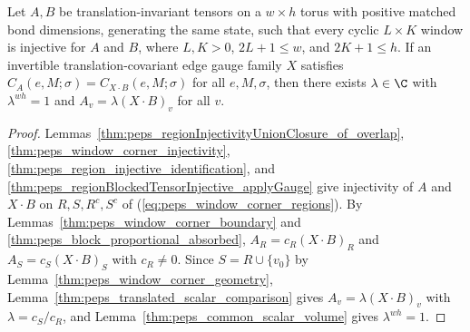 \begin{lemma}%
    \label{thm:peps_window_absorbed_scalar}
    \leanok
    Let $A,B$ be translation-invariant tensors on a $w\times h$ torus with
    positive matched bond dimensions, generating the same state, such that
    every cyclic $L\times K$ window is injective for $A$ and $B$, where
    $L,K>0$, $2L+1\le w$, and $2K+1\le h$. If an invertible
    translation-covariant edge gauge family $X$ satisfies
    $C_A(e,M;\sigma)=C_{X\cdot B}(e,M;\sigma)$ for all $e,M,\sigma$, then there
    exists $\lambda\in\C$ with $\lambda^{wh}=1$ and $A_v=\lambda(X\cdot B)_v$
    for all $v$.
\end{lemma}
\begin{proof}\leanok
    Lemmas~\ref{thm:peps_regionInjectivityUnionClosure_of_overlap},
    \ref{thm:peps_window_corner_injectivity},
    \ref{thm:peps_region_injective_identification}, and
    \ref{thm:peps_regionBlockedTensorInjective_applyGauge} give injectivity of
    $A$ and $X\cdot B$ on $R,S,R^c,S^c$ of
    (\ref{eq:peps_window_corner_regions}). By
    Lemmas~\ref{thm:peps_window_corner_boundary} and
    \ref{thm:peps_block_proportional_absorbed}, $A_R=c_R(X\cdot B)_R$ and
    $A_S=c_S(X\cdot B)_S$ with $c_R\ne0$. Since $S=R\cup\{v_0\}$ by
    Lemma~\ref{thm:peps_window_corner_geometry},
    Lemma~\ref{thm:peps_translated_scalar_comparison} gives
    $A_v=\lambda(X\cdot B)_v$ with $\lambda=c_S/c_R$, and
    Lemma~\ref{thm:peps_common_scalar_volume} gives $\lambda^{wh}=1$.
\end{proof}
